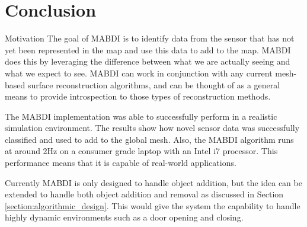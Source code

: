 \section{Conclusion}

\begin{frame}{Motivation} %
  The goal of MABDI is to identify data from the sensor that has not yet been
  represented in the map and use this data to add to the map. MABDI does this by
  leveraging the difference between what we are actually seeing and what we expect
  to see. MABDI can work in conjunction with any current mesh-based surface
  reconstruction algorithms, and can be thought of as a general means to provide
  introspection to those types of reconstruction methods.

  The MABDI implementation was able to successfully perform in a realistic
  simulation environment. The results show how novel sensor data was
  successfully classified and used to add to the global mesh. Also, the MABDI
  algorithm runs at around 2Hz on a consumer grade laptop with an Intel i7
  processor. This performance means that it is capable of real-world
  applications.

  Currently MABDI is only designed to handle object addition, but the idea can be
  extended to handle both object addition and removal as discussed in Section
  \ref{section:algorithmic_design}. This would give the system the
  capability to handle highly dynamic environments such as a door opening and
  closing.
\end{frame}
